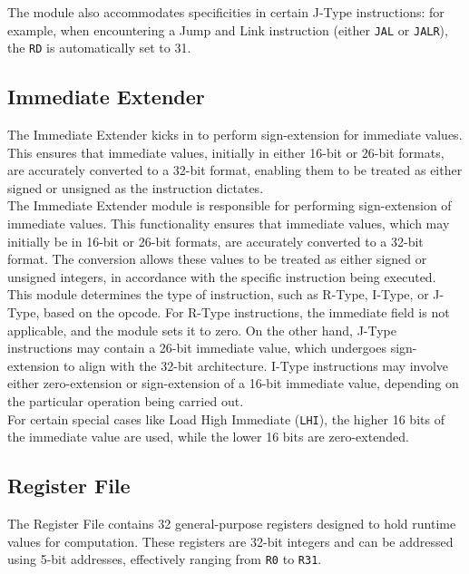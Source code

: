The module also accommodates specificities in certain J-Type instructions: for example, when encountering a Jump and Link instruction (either \texttt{JAL} or \texttt{JALR}), the \texttt{RD} is automatically set to 31.

\subsection{Immediate Extender}
The Immediate Extender kicks in to perform sign-extension for immediate values. This ensures that immediate values, initially in either 16-bit or 26-bit formats, are accurately converted to a 32-bit format, enabling them to be treated as either signed or unsigned as the instruction dictates. \\

The Immediate Extender module is responsible for performing sign-extension of immediate values. This functionality ensures that immediate values, which may initially be in 16-bit or 26-bit formats, are accurately converted to a 32-bit format. The conversion allows these values to be treated as either signed or unsigned integers, in accordance with the specific instruction being executed. \\

This module determines the type of instruction, such as R-Type, I-Type, or J-Type, based on the opcode. For R-Type instructions, the immediate field is not applicable, and the module sets it to zero. On the other hand, J-Type instructions may contain a 26-bit immediate value, which undergoes sign-extension to align with the 32-bit architecture. I-Type instructions may involve either zero-extension or sign-extension of a 16-bit immediate value, depending on the particular operation being carried out. \\

For certain special cases like Load High Immediate (\texttt{LHI}), the higher 16 bits of the immediate value are used, while the lower 16 bits are zero-extended.

\subsection{Register File}
The Register File contains 32 general-purpose registers designed to hold runtime values for computation. These registers are 32-bit integers and can be addressed using 5-bit addresses, effectively ranging from \texttt{R0} to \texttt{R31}. \\

